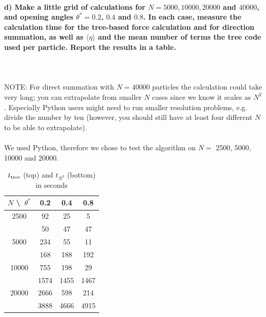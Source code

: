 \newpage
\paragraph{d) Make a little grid of calculations for 
    $N=5000, 10000, 20000$ and $40000$, and opening angles 
    $\theta^*=0.2$, $0.4$ and $0.8$. In each case, measure the 
    calculation time for the tree-based force calculation and 
    for direction summation, as well as $\langle\eta\rangle$ 
    and the mean number of terms the tree code used per particle. 
    Report the results in a table.
} \ \\
    \\
    NOTE: For direct summation with $N=40000$ particles the 
    calculation could take very long; you can extrapolate from 
    smaller $N$ cases since we know it scales as $N^2$.
    Especially Python users might need to run smaller resolution 
    problems, e.g. divide the number by ten (however, you should 
    still have at least four different $N$ to be able to 
    extrapolate). \\
    \\
    We used Python, therefore we chose to test the algorithm on 
    $N=$ 2500, 5000, 10000 and 20000.
    \begin{table}[h!]
        \begin{center}
        \caption{$t_\textnormal{tree}$ (top) and $t_{N^2}$ (bottom) in seconds}
        \begin{tabular}{c | c | c | c}
            $N$ \textbackslash\ $\theta^*$ & 0.2  & 0.4  & 0.8 \\
            \hline
            2500  & 92   & 25   & 5    \\
                  & 50   & 47   & 47   \\
            \hline
            5000  & 234  & 55   & 11   \\
                  & 168  & 188  & 192  \\
            \hline
            10000 & 755  & 198  & 29   \\
                  & 1574 & 1455 & 1467 \\
            \hline
            20000 & 2666 & 598  & 214  \\
                  & 3888 & 4666 & 4915 \\
        \end{tabular}
        \end{center}
    \end{table} 
